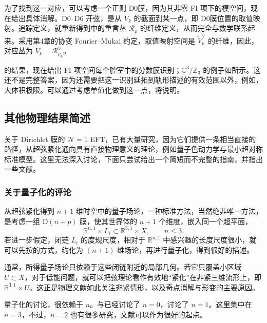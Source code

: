 为了找到这一对应，可以考虑一个正则 D0膜，因为其非零 FI 项下的模空间，现在给出具体消解。D0--D6 开弦，是从 $V_k$ 的截面到某一点，即 D0膜位置的取值映射。追踪定义，就重新得到中的重言丛 $\mathcal{R}_\rho$ 的纤维定义，从而完全与数学联系起来。采用第4章的协变 Fourier--Mukai 约定，取值映射空间是 $\widetilde V_k^\vee$ 的纤维，因此，对应丛为 $\widetilde V_k=\mathcal{R}_{\rho_k}^\vee$。

的结果，现在给出 FI 项空间每个腔室中的分数膜识别；$\mathbb{C}^3/\mathbb{Z}_3$ 的例子如所示。这还不是完整答案，因为还需要把这一识别延拓到轨形描述的有效范围以外，例如，大体积极限。可以通过考虑单值化做到这一点，将说明。

\subsection{其他物理结果简述}\label{sec:5.4.6}

关于 Dirichlet 膜的 $\mathcal{N}=1$ EFT，已有大量研究，因为它们提供一条相当直接的路径，从超弦紧化通向具有直接物理意义的理论，例如量子色动力学与最小超对称标准模型。这里无法深入讨论，下面只尝试给出一个简短而不完整的指南，并指出一些文献。

\subsubsection{关于量子化的评论}\label{sec:5.4.6.1}

从超弦紧化得到 $n+1$ 维时空中的量子场论，一种标准方法，当然绝非唯一方法，是考虑一组 D$(n+p)$ 膜，使其世界体的 $n+1$ 个维度，嵌入同一个超平面，
\[
\mathbb{R}^{n,1}\times L_i\subset\mathbb{R}^{3,1}\times X,\qquad n\le3.
\]
若进一步假定，闭链 $L_i$ 的度规尺度，相对于 $\mathbb{R}^{n,1}$ 中感兴趣的长度尺度很小，就可以先按的方式，约化为 $(n+1)$ 维场论，再进行量子化，得到很好的描述。

通常，所得量子场论只依赖于这些闭链附近的局部几何。若它只覆盖小区域 $U\subset X$，对于低能问题，就可以把弦理论看作有效地“紧化”在非紧三维流形上，即 $\mathbb{R}^{3,1}\times U$。这正是物理文献如此关注非紧情形，以及奇点消解与形变的主要原因。

量子化的讨论，很依赖于 $n$。与已经讨论了 $n=0$，讨论了 $n=1$。这里集中在 $n=3$，不过，$n=2$ 也有很多研究，文献可以作为很好的起点。

